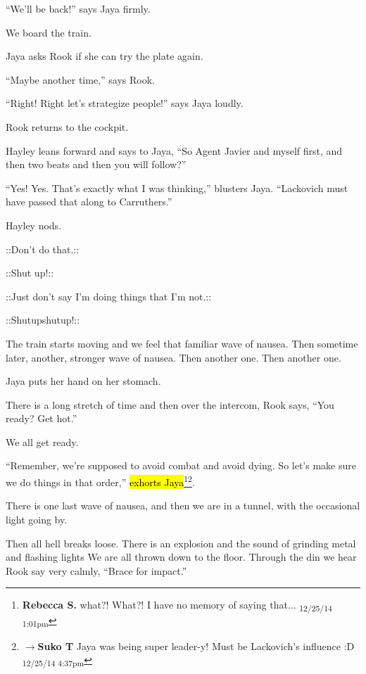 ``We'll be back!'' says Jaya firmly.



We board the train.



Jaya asks Rook if she can try the plate again.  

``Maybe another time,'' says Rook. 

``Right!  Right let's strategize people!'' says Jaya loudly.

Rook returns to the cockpit.

Hayley leans forward and says to Jaya, ``So Agent Javier and myself first, and then two beats and then you will follow?''

``Yes!  Yes.  That's exactly what I was thinking,'' blusters Jaya.  ``Lackovich must have passed that along to Carruthers.''

Hayley nods.

 {\color[RGB]{74,134,232}::Don't do that.::} 

 {\color[RGB]{255,0,0}::Shut up!::} 

 {\color[RGB]{74,134,232}::Just don't say I'm doing things that I'm not.::} 

 {\color[RGB]{255,0,0}::Shutupshutup!::} 



The train starts moving and we feel that familiar wave of nausea.  Then sometime later, another, stronger wave of nausea.  Then another one.  Then another one.  



Jaya puts her hand on her stomach.



There is a long stretch of time and then over the intercom, Rook says, ``You ready?  Get hot.''

We all get ready.  

``Remember, we're supposed to avoid combat and avoid dying.  So let's make sure we do things in that order,'' \hl{exhorts Jaya}\footnote{\textbf{Rebecca S. }what?! What?! I have no memory of saying that... \textsubscript{12/25/14 1:01pm}}\footnote{$\rightarrow$\textbf{Suko T }Jaya was being super leader-y!  Must be Lackovich's influence :D \textsubscript{12/25/14 4:37pm}}.



There is one last wave of nausea, and then we are in a tunnel, with the occasional light going by.  



Then all hell breaks loose.  There is an explosion and the sound of grinding metal and flashing lights  We are all thrown down to the floor.  Through the din we hear Rook say very calmly, ``Brace for impact.''



